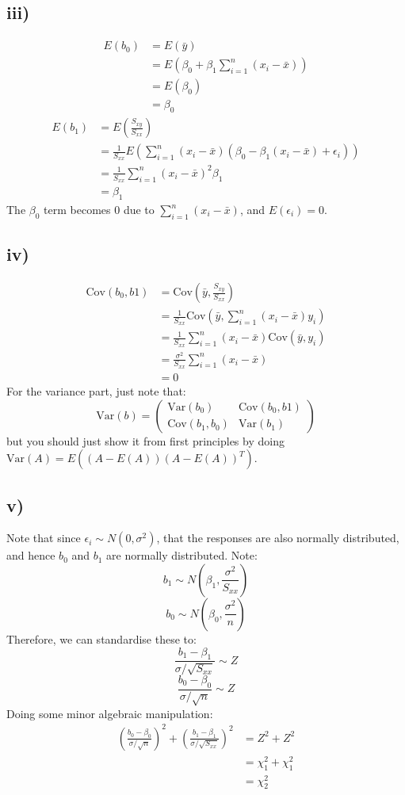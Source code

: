 \documentclass{article}
\begin{document}
\subsection*{iii)}
\begin{align*}
    E(b_0) &= E(\bar{y}) \\ 
    &= E\left(\beta_0 + \beta_1\sum_{i=1}^n(x_i - \bar{x})\right) \\ 
    &= E(\beta_0) \\ 
    &= \beta_0
\end{align*}
\begin{align*}
    E(b_1) &= E\left(\frac{S_{xy}}{S_{xx}}\right) \\ 
    &= \frac{1}{S_{xx}}E\left(\sum_{i=1}^n(x_i-\bar{x})(\beta_0 - \beta_1(x_i-\bar{x}) + \epsilon_i)\right) \\ 
    &= \frac{1}{S_{xx}}\sum_{i=1}^n(x_i-\bar{x})^2\beta_1 \\ 
    &= \beta_1
\end{align*}
The $\beta_0$ term becomes $0$ due to $\sum_{i=1}^n(x_i-\bar{x})$, and $E(\epsilon_i) = 0$.

\subsection*{iv)}
\begin{align*}
    \text{Cov}(b_0, b1) &= \text{Cov}\left(\bar{y}, \frac{S_{xy}}{S_{xx}}\right) \\ 
    &= \frac{1}{S_{xx}}\text{Cov}\left(\bar{y}, \sum_{i=1}^n(x_i - \bar{x})y_i\right) \\ 
    &= \frac{1}{S_{xx}}\sum_{i=1}^n(x_i-\bar{x})\text{Cov}(\bar{y}, y_i) \\ 
    &= \frac{\sigma^2}{S_{xx}}\sum_{i=1}^n(x_i - \bar{x}) \\ 
    &= 0 
\end{align*}
For the variance part, just note that:
$$ \text{Var}(b) = \begin{pmatrix}
    \text{Var}(b_0) & \text{Cov}(b_0, b1) \\ 
    \text{Cov}(b_1, b_0) & \text{Var}(b_1)
\end{pmatrix}$$
but you should just show it from first principles by doing $\text{Var}(A) = E((A - E(A))(A - E(A))^T)$.

\subsection*{v)}
Note that since $\epsilon_i \sim N(0, \sigma^2)$, that the responses are also normally distributed, and hence $b_0$
and $b_1$ are normally distributed. Note:
$$ b_1 \sim N\left(\beta_1, \frac{\sigma^2}{S_{xx}}\right)$$
$$ b_0 \sim N\left(\beta_0, \frac{\sigma^2}{n}\right)$$
Therefore, we can standardise these to:
$$ 
\frac{b_1 - \beta_1}{\sigma/\sqrt{S_{xx}}} \sim Z
$$
$$ 
\frac{b_0 - \beta_0}{\sigma/\sqrt{n}} \sim Z
$$
Doing some minor algebraic manipulation:
\begin{align*}
\left(\frac{b_0 - \beta_0}{\sigma/\sqrt{n}}\right)^2 + \left(\frac{b_1 - \beta_1}{\sigma/\sqrt{S_{xx}}}\right)^2 &= Z^2 + Z^2 \\ 
&= \chi_1^2 + \chi_1^2 \\
&= \chi_2^2 
\end{align*}
\newpage
\end{document}
